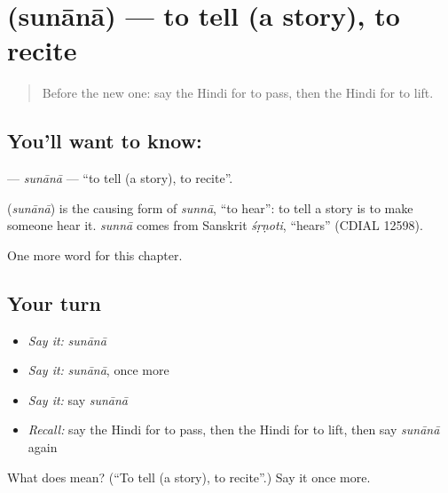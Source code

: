 \section[\texorpdfstring{\hi{सुनाना} (sunānā)}{सुनाना (sunānā)}]{ (sunānā) — to tell (a story), to recite}

\label{lesson:HI-C170-sunana}



\begin{quote}
Before the new one: say the Hindi for to pass, then the Hindi for to lift.
\end{quote}

\subsection*{You'll want to know: }
\textbf{} — \emph{sunānā} — \textquotedblleft{}to tell (a story), to recite\textquotedblright{}.

\begin{cousinweb}
\textbf{} (\emph{sunānā}) is the causing form of \emph{sunnā}, \textquotedblleft{}to hear\textquotedblright{}: to tell a story is to make someone hear it. \emph{sunnā} comes from Sanskrit \emph{śṛṇoti}, \textquotedblleft{}hears\textquotedblright{} (CDIAL 12598).
\end{cousinweb}

\begin{grammarlens}[title={What you've built}]
One more word for this chapter.
\end{grammarlens}

\subsection*{Your turn}
\begin{itemize}
\raggedright
  \item \emph{Say it:} \emph{sunānā}
  \item \emph{Say it:} \emph{sunānā}, once more
  \item \emph{Say it:} say \emph{sunānā}
  \item \emph{Recall:} say the Hindi for to pass, then the Hindi for to lift, then say \emph{sunānā} again
\end{itemize}

\begin{tcolorbox}[breakable,colback=teal!4,colframe=teal!35!black,title={Before you move on}]
What does  mean? (\textquotedblleft{}To tell (a story), to recite\textquotedblright{}.) Say it once more.
\end{tcolorbox}
